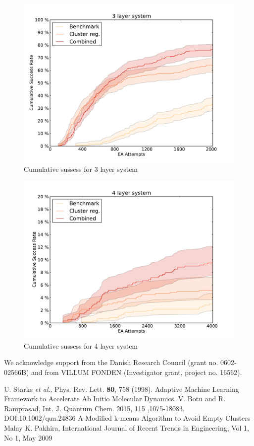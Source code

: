 \documentclass[%
 aps,
 prl,%
 amsmath,amssymb,
 reprint,%
]{revtex4-1}
\begin{document}
\begin{figure}[h]
    \centering
    \includegraphics[width=1.0\columnwidth]{3lsuccess.pdf}
    \caption{Cumulative sussess for 3 layer system}
    \label{fig:fig5}
\end{figure}


\begin{figure}[h]
    \centering
    \includegraphics[width=1.0\columnwidth]{4lsuccess.pdf}
    \caption{Cumulative sussess for 4 layer system}
    \label{fig:fig6}
\end{figure}



We acknowledge support from the Danish Research Council (grant no. 0602-02566B) and from VILLUM FONDEN (Investigator grant, project no. 16562).

\begin{thebibliography}{12}  
   U. Starke \textit{et al}., Phys. Rev. Lett. \textbf{80}, 758 (1998).    
   {Adaptive Machine Learning Framework to Accelerate Ab Initio Molecular Dynamics.} V. Botu and R. Ramprasad, Int. J. Quantum Chem. 2015, 115 ,1075-18083. DOI:10.1002/qua.24836    
  {A Modified k-means Algorithm to Avoid Empty Clusters} Malay K. Pakhira, International Journal of Recent Trends in Engineering, Vol 1, No 1, May 2009
 \end{thebibliography}
\end{document}
